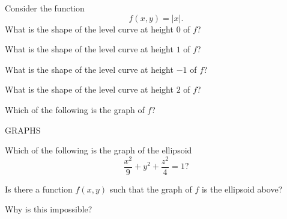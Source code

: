 \documentclass{ximera}
\begin{document}
\begin{problem}
Consider the function
\[
f(x,y) = |x|.
\]
What is the shape of the level curve at height $0$ of $f$?
\begin{multipleChoice}
\end{multipleChoice}

What is the shape of the level curve at height $1$ of $f$?
\begin{multipleChoice}
\end{multipleChoice}

What is the shape of the level curve at height $-1$ of $f$?
\begin{multipleChoice}
\end{multipleChoice}

What is the shape of the level curve at height $2$ of $f$?
\begin{multipleChoice}
\end{multipleChoice}

Which of the following is the graph of $f$?

GRAPHS
\end{problem}

\begin{problem}
Which of the following is the graph of the ellipsoid
\[
\frac{x^2}{9}+ y^2 + \frac{z^2}{4} = 1?
\]

Is there a function $f(x,y)$ such that the graph of $f$ is the ellipsoid above?
\begin{multipleChoice}
\end{multipleChoice}

\begin{problem}
Why is this impossible?
\begin{multipleChoice}
\end{multipleChoice}
\end{problem}

\end{problem}
\end{document}
